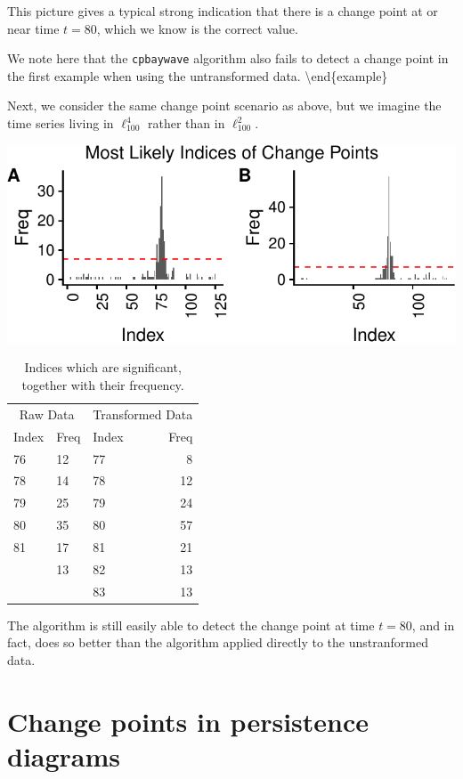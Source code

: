 \documentclass[smallextended]{svjour3}       %
\begin{document}
This picture gives a typical strong indication that there is a change
point at or near time \(t = 80\), which we know is the correct value.

We note here that the \texttt{cpbaywave} algorithm also fails to detect
a change point in the first example when using the untransformed data.
\textbackslash{}end\{example\}

Next, we consider the same change point scenario as above, but we
imagine the time series living in \(\ell_{100}^4\) rather than in
\(\ell_{100}^2\).

\begin{center}\includegraphics{springer_template_files/figure-latex/chunk_5_5-1} \end{center}

\begin{longtable}[t]{lllr}
\caption{\label{tab:chunk_5_75}Indices which are significant, together with their frequency.}\\
\toprule
\multicolumn{2}{c}{Raw Data} & \multicolumn{2}{c}{Transformed Data} \\
\cmidrule(l{2pt}r{2pt}){1-2} \cmidrule(l{2pt}r{2pt}){3-4}
Index & Freq & Index & Freq\\
\midrule
76 & 12 & 77 & 8\\
78 & 14 & 78 & 12\\
79 & 25 & 79 & 24\\
80 & 35 & 80 & 57\\
81 & 17 & 81 & 21\\
\addlinespace
82 & 13 & 82 & 13\\
 &  & 83 & 13\\
\bottomrule
\end{longtable}

The algorithm is still easily able to detect the change point at time
\(t = 80\), and in fact, does so better than the algorithm applied
directly to the unstranformed data.

\section{Change points in persistence diagrams}\label{sec:2}
\end{document}

